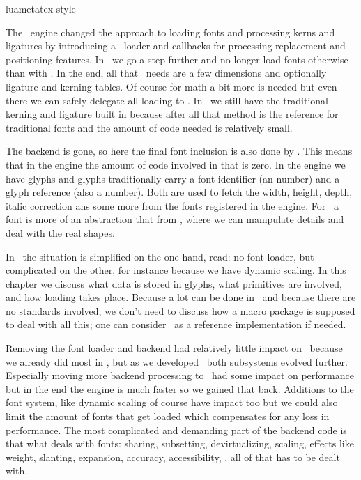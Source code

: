 
\environment luametatex-style

\startdocument[title=Fonts]

\startsection[title={Introduction}]

The \LUATEX\ engine changed the approach to loading fonts and processing kerns
and ligatures by introducing a \LUA\ loader and callbacks for processing
replacement and positioning features. In \LUAMETATEX\ we go a step further and no
longer load fonts otherwise than with \LUA. In the end, all that \TEX\ needs are
a few dimensions and optionally ligature and kerning tables. Of course for math a
bit more is needed but even there we can safely delegate all loading to \LUA. In
\LUAMETATEX\ we still have the traditional kerning and ligature built in because
after all that method is the reference for traditional fonts and the amount of
code needed is relatively small.

The backend is gone, so here the final font inclusion is also done by \LUA. This
means that in the engine the amount of code involved in that is zero. In the
engine we have glyphs and glyphs traditionally carry a font identifier (an
number) and a glyph reference (also a number). Both are used to fetch the width,
height, depth, italic correction ans some more from the fonts registered in the
engine. For \TEX\ a font is more of an abstraction that from \LUA, where we can
manipulate details and deal with the real shapes.

In \LUAMETATEX\ the situation is simplified on the one hand, read: no font
loader, but complicated on the other, for instance because we have dynamic
scaling. In this chapter we discuss what data is stored in glyphs, what
primitives are involved, and how loading takes place. Because a lot can be done
in \LUA\ and because there are no standards involved, we don't need to discuss
how a macro package is supposed to deal with all this; one can consider \CONTEXT\
as a reference implementation if needed.

Removing the font loader and backend had relatively little impact on \CONTEXT\
because we already did most in \LUA, but as we developed \LUAMETATEX\ both
subsystems evolved further. Especially moving more backend processing to \LUA\
had some impact on performance but in the end the engine is much faster so we
gained that back. Additions to the font system, like dynamic scaling of course
have impact too but we could also limit the amount of fonts that get loaded which
compensates for any loss in performance. The most complicated and demanding part
of the backend code is that what deals with fonts: sharing, subsetting,
devirtualizing, scaling, effects like weight, slanting, expansion, accuracy,
accessibility, \unknown, all of that has to be dealt with.

